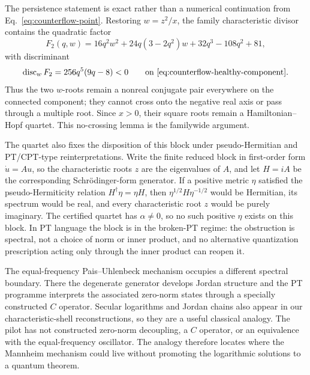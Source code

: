 \documentclass[11pt]{article}
\begin{document}
The persistence statement is exact rather than a numerical continuation from
Eq.~\eqref{eq:counterflow-point}.  Restoring
$w=z^2/x$, the family characteristic divisor contains the quadratic factor
\begin{equation}
 F_2(q,w)=16q^2w^2+24q(3-2q^2)w
          +32q^3-108q^2+81,
 \end{equation}
with discriminant
\begin{equation}
 \operatorname{disc}_wF_2=256q^5(9q-8)<0
 \qquad\text{on \eqref{eq:counterflow-healthy-component}.}
 \label{eq:counterflow-discriminant}
\end{equation}
Thus the two $w$-roots remain a nonreal conjugate pair everywhere on the
connected component; they cannot cross onto the negative real axis or pass
through a multiple root.  Since $x>0$, their square roots remain a
Hamiltonian--Hopf quartet.  This no-crossing lemma is the familywide argument.

The quartet also fixes the disposition of this block under
pseudo-Hermitian and PT/CPT-type reinterpretations\cite{BenderMannheim}.
Write the finite reduced block in first-order form $\dot u=Au$, so the
characteristic roots $z$ are the eigenvalues of $A$, and let $H=iA$ be
the corresponding Schr\"odinger-form generator.  If a positive metric
$\eta$ satisfied the pseudo-Hermiticity relation $H^\dagger\eta=\eta H$,
then $\eta^{1/2}H\eta^{-1/2}$ would be Hermitian, its spectrum would be
real, and every characteristic root $z$ would be purely imaginary.  The
certified quartet has $\alpha\neq0$, so no such positive $\eta$ exists on
this block.  In PT language the block is in the broken-PT regime: the
obstruction is spectral, not a choice of norm or inner product, and no
alternative quantization prescription acting only through the inner
product can reopen it.

The equal-frequency Pais--Uhlenbeck mechanism occupies a different spectral
boundary.  There the degenerate generator develops Jordan structure and the
PT programme interprets the associated zero-norm states through a specially
constructed $C$ operator\cite{PaisUhlenbeck,BenderMannheimPRD}.  Secular
logarithms and Jordan chains also appear in our characteristic-shell
reconstructions, so they are a useful classical analogy.  The pilot has not
constructed zero-norm decoupling, a $C$ operator, or an equivalence with the
equal-frequency oscillator.  The analogy therefore locates where the
Mannheim mechanism could live without promoting the logarithmic solutions
to a quantum theorem.
\end{document}
